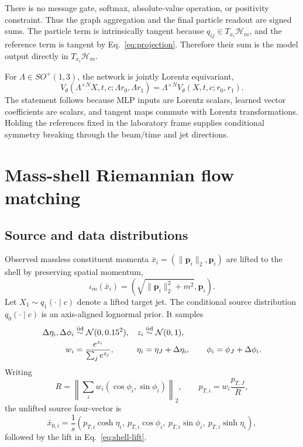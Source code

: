 \documentclass[10pt]{article}
\newcommand{\HH}{\mathcal{H}}
\begin{document}
There is no message gate, softmax, absolute-value operation, or positivity constraint.
Thus the graph aggregation and the final particle readout are signed sums. The
particle term is intrinsically tangent because $q_{ij}\in T_{x_i}\HH_m$, and the
reference term is tangent by Eq.~\eqref{eq:projection}. Therefore their sum is
the model output directly in $T_{x_i}\HH_m$.

For $\Lambda\in SO^+(1,3)$, the network is jointly Lorentz equivariant,
\begin{equation}
 V_\theta(\Lambda^{\times N}X,t,c;\Lambda r_0,\Lambda r_1)
 =\Lambda^{\times N}V_\theta(X,t,c;r_0,r_1).
 \label{eq:equivariance}
\end{equation}
The statement follows because MLP inputs are Lorentz scalars, learned vector
coefficients are scalars, and tangent maps commute with Lorentz transformations.
Holding the references fixed in the laboratory frame supplies conditional symmetry
breaking through the beam/time and jet directions.

\section{Mass-shell Riemannian flow matching}

\subsection{Source and data distributions}

Observed massless constituent momenta $\bar x_i=(\|\bm p_i\|_2,\bm p_i)$ are
lifted to the shell by preserving spatial momentum,
\begin{equation}
 \iota_m(\bar x_i)=\left(\sqrt{\|\bm p_i\|_2^2+m^2},\bm p_i\right).
 \label{eq:shell-lift}
\end{equation}
Let $X_1\sim q_1(\cdot\mid c)$ denote a lifted target jet. The conditional source
distribution $q_0(\cdot\mid c)$ is an axis-aligned lognormal prior. It samples
\begin{align}
 \Delta\eta_i,\Delta\phi_i&\stackrel{\rm iid}{\sim}\mathcal{N}(0,0.15^2),&
 z_i&\stackrel{\rm iid}{\sim}\mathcal{N}(0,1),\\
 w_i&=\frac{e^{z_i}}{\sum_j e^{z_j}},&
 \eta_i&=\eta_J+\Delta\eta_i,\qquad\phi_i=\phi_J+\Delta\phi_i.
\end{align}
Writing
\begin{equation}
 R=\left\|\sum_iw_i(\cos\phi_i,\sin\phi_i)\right\|_2,
 \qquad p_{T,i}=w_i\frac{p_{T,J}}{R},
 \label{eq:prior-pt}
\end{equation}
the unlifted source four-vector is
\begin{equation}
 \bar x_{0,i}=\frac{1}{s}
 (p_{T,i}\cosh\eta_i,\ p_{T,i}\cos\phi_i,\ p_{T,i}\sin\phi_i,\ p_{T,i}\sinh\eta_i),
\end{equation}
followed by the lift in Eq.~\eqref{eq:shell-lift}.
\end{document}
